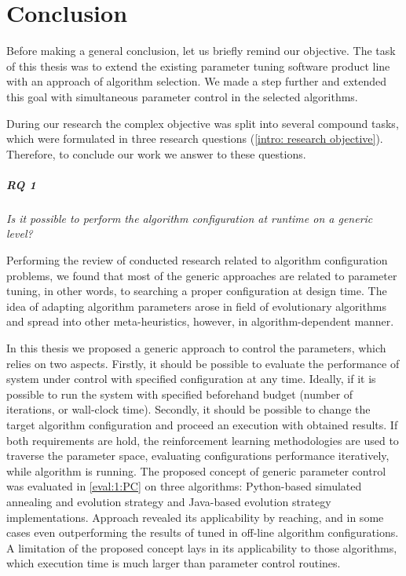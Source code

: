 \chapter{Conclusion}\label{conclusion}
Before making a general conclusion, let us briefly remind our objective.
The task of this thesis was to extend the existing parameter tuning software product line with an approach of algorithm selection. We made a step further and extended this goal with simultaneous parameter control in the selected algorithms.

During our research the complex objective was split into several compound tasks, which were formulated in three research questions (\cref{intro: research objective}). Therefore, to conclude our work we answer to these questions.

\paragraph{RQ 1} \emph{Is it possible to perform the algorithm configuration at runtime on a generic level?}
	
Performing the review of conducted research related to algorithm configuration problems, we found that most of the generic approaches are related to parameter tuning, in other words, to searching a proper configuration at design time. The idea of adapting algorithm parameters arose in field of evolutionary algorithms and spread into other meta-heuristics, however, in algorithm-dependent manner. 
	
In this thesis we proposed a generic approach to control the parameters, which relies on two aspects. Firstly, it should be possible to evaluate the performance of system under control with specified configuration at any time. Ideally, if it is possible to run the system with specified beforehand budget (number of iterations, or wall-clock time). Secondly, it should be possible to change the target algorithm configuration and proceed an execution with obtained results. If both requirements are hold, the reinforcement learning methodologies are used to traverse the parameter space, evaluating configurations performance iteratively, while algorithm is running. The proposed concept of generic parameter control was evaluated in \cref{eval:1:PC} on three algorithms: Python-based simulated annealing and evolution strategy and Java-based evolution strategy implementations. Approach revealed its applicability by reaching, and in some cases even outperforming the results of tuned in off-line algorithm configurations. A limitation of the proposed concept lays in its applicability to those algorithms, which execution time is much larger than parameter control routines.
	

